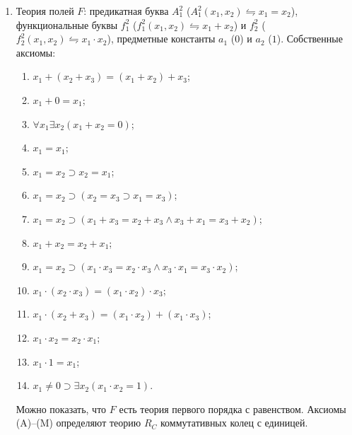 \begin{enumerate}
    \item Теория полей $F$: предикатная буква $A_1^2$ ($A_1^2(x_1, x_2) \leftrightharpoons x_1 = x_2$), функциональные буквы $f_1^2$ ($f_1^2(x_1, x_2) \leftrightharpoons x_1 + x_2$) и $f_2^2$ ($f_2^2(x_1, x_2) \leftrightharpoons x_1\cdot x_2$), предметные константы $a_1$ ($0$) и $a_2$ ($1$). Собственные аксиомы:
    \begin{enumerate}[label=\Alph*.]
        \item $x_1 + (x_2 + x_3) = (x_1 + x_2) + x_3$;
        \item $x_1 + 0 = x_1$;
        \item $\forall x_1\exists x_2(x_1 + x_2 = 0)$;
        \item $x_1 = x_1$;
        \item $x_1 = x_2 \supset x_2 = x_1$;
        \item $x_1 = x_2 \supset (x_2 = x_3 \supset x_1 = x_3)$;
        \item $x_1 = x_2 \supset (x_1 + x_3 = x_2 + x_3 \land x_3 + x_1 = x_3 + x_2)$;
        \item $x_1 + x_2 = x_2 + x_1$;
        \item $x_1 = x_2 \supset (x_1\cdot x_3 = x_2\cdot x_3 \land x_3 \cdot x_1 = x_3 \cdot x_2)$;
        \item $x_1\cdot(x_2\cdot x_3) = (x_1\cdot x_2)\cdot x_3$;
        \item $x_1\cdot(x_2 + x_3) = (x_1\cdot x_2) + (x_1\cdot x_3)$;
        \item $x_1\cdot x_2 = x_2\cdot x_1$;
        \item $x_1\cdot 1 = x_1$;
        \item $x_1 \neq 0 \supset \exists x_2(x_1\cdot x_2 = 1)$.
    \end{enumerate}
    Можно показать, что $F$ есть теория первого порядка с равенством. Аксиомы (A)--(M) определяют теорию $R_C$ коммутативных колец с единицей.
\end{enumerate}